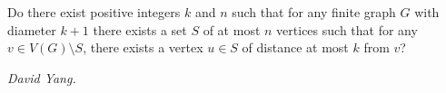 Do there exist positive integers $k$ and $n$ such that for any finite graph $G$ with diameter $k+1$ there exists a set $S$ of at most $n$ vertices such that for any $v\in V(G)\setminus S$, there exists a vertex $u\in S$ of distance at most $k$ from $v$?

\textit{David Yang.}